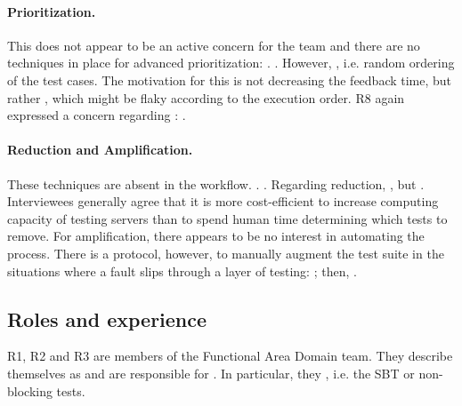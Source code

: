 \paragraph{Prioritization.} This does not appear to be an active concern for the team and there are no techniques in place for advanced prioritization: .
.
However, , i.e. random ordering of the test cases.
The motivation for this is not decreasing the feedback time, but rather , which might be flaky according to the execution order.
R8 again expressed a concern regarding \tcp: .

\paragraph{Reduction and Amplification.} These techniques are absent in the workflow. . .
Regarding reduction, , but .
Interviewees generally agree that it is more cost-efficient to increase computing capacity of testing servers than to spend human time determining which tests to remove.
For amplification, there appears to be no interest in automating the process.
There is a protocol, however, to manually augment the test suite in the situations where a fault slips through a layer of testing: ; then, .


\subsection{Roles and experience}

R1, R2 and R3 are members of the Functional Area Domain team.
They describe themselves as  and are responsible for .
In particular, they , i.e. the SBT or non-blocking tests.

